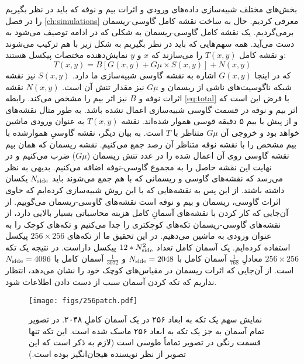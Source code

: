 بخش‌های مختلف شبیه‌سازی داده‌های ورودی و اثرات بیم و نوفه که باید در نظر بگیریم را در فصل 
\ref{ch:simulations}
معرفی کردیم. حال به ساخت نقشه کامل گاوسی-ریسمان برمی‌گردیم. یک نقشه کامل گاوسی-ریسمان به شکلی که در ادامه توصیف می‌شود به دست می‌آید.
همه سهم‌هایی که باید در نظر بگیریم به شکل زیر با هم ترکیب می‌شوند و نقشه کامل
$T(x,y)$
را می‌سازند که $x$ و $y$  نمایش‌دهنده مختصات پیکسل هستند:
\begin{equation}
T(x,y) = B[G(x,y) + G\mu \times S(x,y)] + N(x,y)
\label{eq:total}
\end{equation}
که در اینجا 
$G(x,y)$
اشاره به نقشه گاوسی شبیه‌سازی ما دارد.   
$S(x,y)$
نیز نقشه شبکه ناگوسیت‌های ناشی از ریسمان و 
$G\mu$ 
نیز مقدار تنش آن است.
$N(x,y)$
نقشه اثرات نوفه و $B$ نیز اثر بیم را مشخص می‌کند.
رابطه
\ref{eq:total}
با فرض این است که اثر بیم و نوفه در قسمت گاوسی شبیه‌سازی اعمال نشده باشد. به طور مثال نقشه‌های 
و
از پیش با بیم ۵ دقیقه قوسی هموار شده‌اند.
نقشه
$T(x,y)$
به عنوان ورودی ماشین خواهد بود و خروجی آن $G\mu$ متناظر با $T$ است.
به بیان دیگر، نقشه گاوسیِ هموارشده با بیم مشخص را با نقشه نوفه متناظر آن رصد جمع می‌کنیم. نقشه ریسمان که همان بیم نقشه گاوسی روی آن اعمال شده را در عدد تنش ریسمان ($G\mu$) ضرب می‌کنیم و در نهایت این نقشه حاصل را به مجموع گاوسی-نوفه اضافه می‌کنیم. بدیهی به نظر می‌رسد که نقشه‌های گاوسی و ریسمانی که با هم جمع می‌شوند باید $N_{\rm side}$ یکسان داشته باشند. از این پس به نقشه‌هایی که با این روش شبیه‌سازی کرده‌ایم که حاوی اثرات گاوسی، ریسمان و بیم و نوفه است نقشه‌های گاوسی-ریسمان می‌گوییم.
از آن‌جایی که کار کردن با نقشه‌های آسمانِ کامل هزینه محاسباتی بسیار بالایی دارد، از نقشه‌های گاوسی-ریسمان تکه‌های کوچکتری را جدا می‌کنیم و تکه‌های کوچک را به عنوان ورودی به ماشین می‌دهیم.   
در این تحقیق ما از تکه‌های
$256\times256$
پیکسل استفاده کرده‌ایم. یک آسمان کامل تعداد 
$12*N_{\rm side}^2$
پیکسل داراست. در نتیجه یک تکه 
$256\times256$
معادلِ $\frac{1}{768}$ آسمان کامل با $N_{\rm side} = 2048$ و $\frac{1}{3072}$ آسمان کامل با $N_{\rm side} = 4096$  است. از آن‌جایی که اثرات ریسمان در مقیاس‌های کوچک خود را نشان می‌دهد، انتظار نداریم که تکه کردن آسمان سبب از دست دادن اطلاعات شود. 

\begin{figure}
	\begin{center}
		\texttt{[image: figs/256patch.pdf]}
	\end{center}
	\caption{ 
	 نمایش سهم یک تکه به ابعاد ۲۵۶ در یک آسمان کاملِ ۲۰۴۸.  
	در تصویر تمام آسمان به جز یک تکه به ابعاد ۲۵۶ ماسک شده است. این تکه تنها قسمت رنگی در تصویر تماماً طوسی است (لازم به ذکر است که این تصویر از نظر نویسنده هیجان‌انگیز بوده است.)
}
	\label{fig:256patch}
\end{figure}

